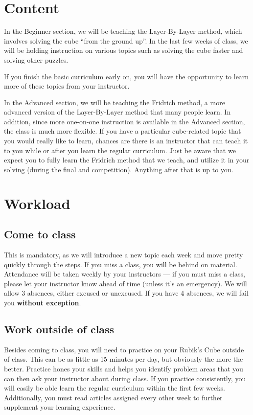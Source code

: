 \documentclass[11pt]{article}
\begin{document}
\section*{Content}
In the Beginner section, we will be teaching the Layer-By-Layer method, which involves solving the cube “from the ground up”. In the last few weeks of class, we will be holding instruction on various topics such as solving the cube faster and solving other puzzles. 

If you finish the basic curriculum early on, you will have the opportunity to learn more of these topics from your instructor.

In the Advanced section, we will be teaching the Fridrich method, a more advanced version of the Layer-By-Layer method that many people learn. In addition, since more one-on-one instruction is available in the Advanced section, the class is much more flexible. If you have a particular cube-related topic that you would really like to learn, chances are there is an instructor that can teach it to you while or after you learn the regular curriculum. Just be aware that we expect you to fully learn the Fridrich method that we teach, and utilize it in your solving (during the final and competition). Anything after that is up to you.



\section*{Workload}
\subsection*{Come to class}
This is mandatory, as we will introduce a new topic each week and move pretty quickly through the steps. If you miss a class, you will be behind on material. Attendance will be taken weekly by your instructors — if you must miss a class, please let your instructor know ahead of time (unless it’s an emergency). We will allow 3 absences, either excused or unexcused. If you have 4 absences, we will fail you \textbf{without exception}.

\subsection*{Work outside of class}
Besides coming to class, you will need to practice on your Rubik’s Cube outside of class. This can be as little as 15 minutes per day, but obviously the more the better. Practice hones your skills and helps you identify problem areas that you can then ask your instructor about during class. If you practice consistently, you will easily be able learn the regular curriculum within the first few weeks.  Additionally, you must read articles assigned every other week to further supplement your learning experience.
\end{document}
